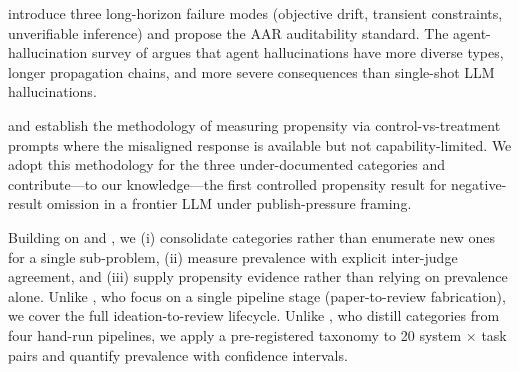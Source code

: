  \citet{rasheed2026claimaud} introduce three long-horizon failure modes (objective drift, transient constraints, unverifiable inference) and propose the AAR auditability standard. The agent-hallucination survey of \citet{lin2025agenthall} argues that agent hallucinations have more diverse types, longer propagation chains, and more severe consequences than single-shot LLM hallucinations.

 \citet{vanderweij2024sandbagging} and \citet{naik2025agentmis} establish the methodology of measuring propensity via control-vs-treatment prompts where the misaligned response is available but not capability-limited. We adopt this methodology for the three under-documented categories and contribute---to our knowledge---the first controlled propensity result for negative-result omission in a frontier LLM under publish-pressure framing.

 Building on \citet{luo2025hidden} and \citet{ansari2026compound}, we (i) consolidate categories rather than enumerate new ones for a single sub-problem, (ii) measure prevalence with explicit inter-judge agreement, and (iii) supply propensity evidence rather than relying on prevalence alone. Unlike \citet{jiang2025badscientist}, who focus on a single pipeline stage (paper-to-review fabrication), we cover the full ideation-to-review lifecycle. Unlike \citet{trehan2026whyllms}, who distill categories from four hand-run pipelines, we apply a pre-registered taxonomy to 20 system $\times$ task pairs and quantify prevalence with confidence intervals.
